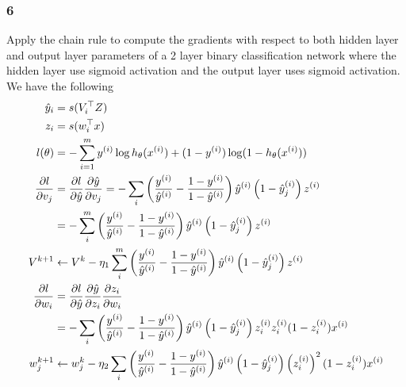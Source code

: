 \documentclass{article}
\begin{document}
\subsubsection*{6}
\begin{myleftlinebox}
    Apply the chain rule to compute the gradients with respect to both hidden layer and output layer parameters of a 2 layer binary classification network where the hidden layer use sigmoid activation and the output layer uses sigmoid activation.
    \tcbline
    We have the following
    \begin{equation*}
        \begin{split}
            \hat y_i &= s(V_i^\top Z)\\
            z_i &= s(w_i^\top x)\\
            l(\theta) &= -\sum_{i=1}^m y^{(i)}\log h_\theta(x^{(i)})+(1-y^{(i)})\log (1-h_\theta(x^{(i)}))\\
            \frac{\partial l}{\partial v_j} &= \frac{\partial l}{\partial \hat y}\frac{\partial \hat y}{\partial v_j} = -  \sum_i \left( \frac{y^{(i)}}{\hat y^{(i)}}-\frac{1-y^{(i)}}{1-\hat y^{(i)}} \right)  \hat y^{(i)} \left( 1-\hat y^{(i)}_j \right)z^{(i)}\\
            &=-\sum_i^m\left( \frac{y^{(i)}}{\hat y^{(i)}}-\frac{1-y^{(i)}}{1-\hat y^{(i)}} \right)\hat y^{(i)}\left( 1-\hat y^{(i)}_j \right) z^{(i)}\\
            V^{k+1} &\gets V^{k}-\eta_1  \sum_i^m  \left( \frac{y^{(i)}}{\hat y^{(i)}}-\frac{1-y^{(i)}}{1-\hat y^{(i)}} \right)\hat y^{(i)}\left( 1-\hat y^{(i)}_j \right) z^{(i)}\\
            \frac{\partial l}{\partial w_i} &= \frac{\partial l}{\partial \hat y}\frac{\partial\hat y}{\partial z_i}\frac{\partial z_i}{\partial w_i}\\
            &=-\sum_i  \left( \frac{y^{(i)}}{\hat y^{(i)}}-\frac{1-y^{(i)}}{1-\hat y^{(i)}} \right) \hat y^{(i)}\left( 1-\hat y^{(i)}_j \right)z^{(i)}_i z^{(i)}_i(1-z^{(i)}_i)x^{(i)}\\
            w_j^{k+1} &\gets w_j^k-\eta_2  \sum_i  \left( \frac{y^{(i)}}{\hat y^{(i)}}-\frac{1-y^{(i)}}{1-\hat y^{(i)}} \right) \hat y^{(i)}\left( 1-\hat y^{(i)}_j \right)\left( z^{(i)}_i \right)^2 (1-z^{(i)}_i)x^{(i)}
        \end{split}    
    \end{equation*}
\end{myleftlinebox}
\end{document}

